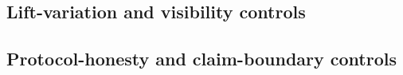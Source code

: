 \subsection{Lift-variation and visibility controls}\label{subsec:control-panel-lift-visibility}


\subsection{Protocol-honesty and claim-boundary controls}\label{subsec:control-panel-protocol-claim}

